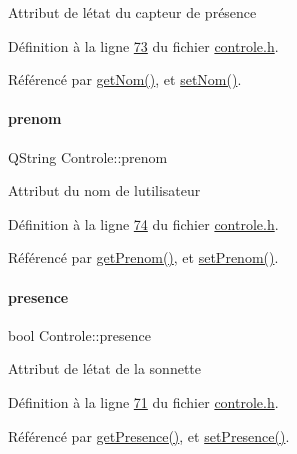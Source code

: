 Attribut de l\textquotesingle{}état du capteur de présence 

Définition à la ligne \hyperlink{controle_8h_source_l00073}{73} du fichier \hyperlink{controle_8h_source}{controle.\+h}.



Référencé par \hyperlink{controle_8cpp_source_l00080}{get\+Nom()}, et \hyperlink{controle_8cpp_source_l00075}{set\+Nom()}.

\mbox{\label{class_controle_a29e37e25a6fd4643ddea3fef47e3bc51}} 
\paragraph{\texorpdfstring{prenom}{prenom}}
{\footnotesize\ttfamily Q\+String Controle\+::prenom\hspace{0.3cm}{\ttfamily [private]}}

Attribut du nom de l\textquotesingle{}utilisateur 

Définition à la ligne \hyperlink{controle_8h_source_l00074}{74} du fichier \hyperlink{controle_8h_source}{controle.\+h}.



Référencé par \hyperlink{controle_8cpp_source_l00088}{get\+Prenom()}, et \hyperlink{controle_8cpp_source_l00084}{set\+Prenom()}.

\mbox{\label{class_controle_a089f74f48f24f09e7fc51b03a5ede79e}} 
\paragraph{\texorpdfstring{presence}{presence}}
{\footnotesize\ttfamily bool Controle\+::presence\hspace{0.3cm}{\ttfamily [private]}}

Attribut de l\textquotesingle{}état de la sonnette 

Définition à la ligne \hyperlink{controle_8h_source_l00071}{71} du fichier \hyperlink{controle_8h_source}{controle.\+h}.



Référencé par \hyperlink{controle_8cpp_source_l00043}{get\+Presence()}, et \hyperlink{controle_8cpp_source_l00038}{set\+Presence()}.

\mbox{\label{class_controle_a0bbdd7a0c44fbbc45bf3a381872fcfbe}} 

